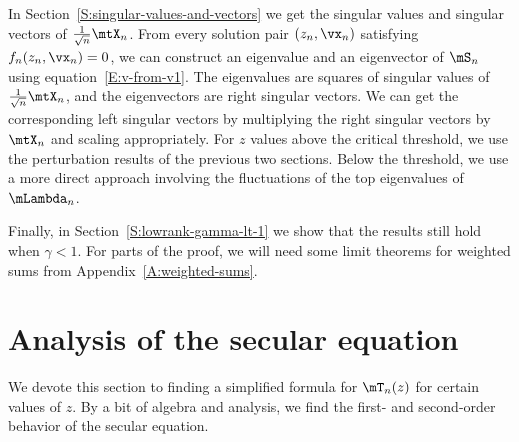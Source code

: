 In Section~\ref{S:singular-values-and-vectors} we get the singular values and singular vectors of $\frac{1}{\sqrt{n}} \mtX_n$.  From every solution pair $(z_n, \vx_n)$ satisfying $f_n(z_n, \vx_n) = 0$, we can construct an eigenvalue and an eigenvector of $\mS_n$ using equation~\eqref{E:v-from-v1}.
The eigenvalues are squares of singular values of $\frac{1}{\sqrt{n}}\mtX_n$, and the eigenvectors are right singular vectors.  We can get the corresponding left singular vectors by multiplying the right singular vectors by $\mtX_n$ and scaling appropriately.  For $z$ values above the critical threshold, we use the perturbation results of the previous two sections.  Below the threshold, we use a more direct approach involving the fluctuations of the top eigenvalues of $\mLambda_n$.

Finally, in Section~\ref{S:lowrank-gamma-lt-1} we show that the results still hold when $\gamma < 1$.  For parts of the proof, we will need some limit theorems for weighted sums from 
Appendix~\ref{A:weighted-sums}.

\section{Analysis of the secular equation}\label{S:anal-sec-eqn}

We devote this section to finding a simplified formula for $\mT_n(z)$ for certain values of $z$.  By a bit of algebra and analysis, we find the first- and second-order behavior of the secular equation.

